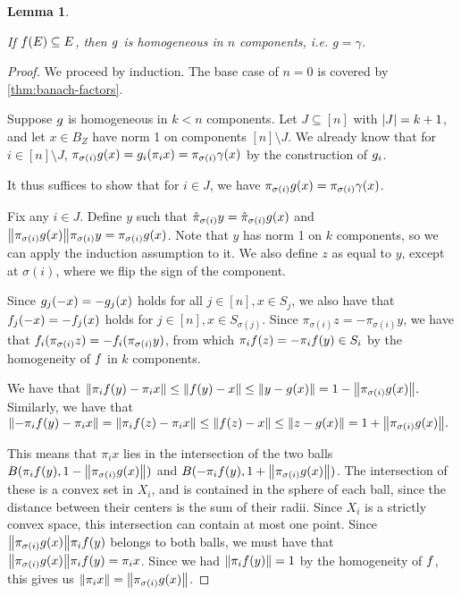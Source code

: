 \documentclass{amsart}
\newtheorem{lemma}{Lemma}[section]
\theoremstyle{definition}
\begin{document}
\begin{lemma} \label{lem:g-homogeneous}

  \annotation
  If $f(E) \subseteq E$, then $g$ is homogeneous in $n$ components, i.e. $g = \gamma$.
\end{lemma}
\begin{proof} 

  We proceed by induction. The base case of $n=0$ is covered by \autoref{thm:banach-factors}.

  Suppose $g$ is homogeneous in $k < n$ components. Let $J \subseteq [n]$ with
  $\abs{J} = k+1$, and let $x \in B_Z$ have norm 1 on components $[n] \setminus J$. We
  already know that for $i \in [n]\setminus J$, $\pi_{\sigma(i)} g(x) = g_i (\pi_i x)
  = \pi_{\sigma(i)} \gamma (x)$ by
  the construction of $g_i$.

  It thus suffices to show that for $i \in J$, we have $\pi_{\sigma(i)} g(x) =
  \pi_{\sigma(i)} \gamma(x)$.

	Fix any $i \in J$. Define $y$ such that $\hat{\pi}_{\sigma(i)} y = \hat{\pi}_{\sigma(i)} g(x)$ and $\norm{\pi_{\sigma(i)} g(x)} \pi_{\sigma(i)} y = \pi_{\sigma(i)} g(x)$. Note that
	$y$ has norm 1 on $k$ components, so we can apply the induction assumption to it.
	We also define $z$ as equal to $y$, except at $\sigma(i)$, where we flip the
	sign of the component.



	Since $g_j (-x) = -g_j (x)$ holds for all $j \in [n], x \in S_j$, we also have that
	$f_j (-x) = -f_j (x)$ holds for
	$j \in [n], x \in S_{\sigma(j)}$. Since $\pi_{\sigma(i)} z = -\pi_{\sigma(i)} y$, we have that
  $f_i (\pi_{\sigma(i)} z) = -f_i (\pi_{\sigma(i)} y)$, from which
  $\pi_i f(z) = -\pi_i f(y) \in S_i$ by the homogeneity of $f$ in $k$ components.

  We have that
  $ \norm{\pi_i f(y) - \pi_i x} \leq \norm{f(y) - x} \leq \norm{y - g(x)} = 1 - \norm{\pi_{\sigma(i)} g(x)}. $
	Similarly, we have that
  $ \norm{-\pi_i f(y) - \pi_i x} = \norm{\pi_i f(z) - \pi_i x} \leq \norm{f(z) - x} \leq \norm{z - g(x)} = 1 + \norm{\pi_{\sigma(i)} g(x)}. $


  This means that $\pi_i x$ lies in the
	intersection of the two balls $B(\pi_i f(y), 1-\norm{\pi_{\sigma(i)} g(x)})$ and
	$B(-\pi_i f(y), 1+\norm{\pi_{\sigma(i)} g(x)})$. The intersection of these is a convex
	set in $X_i$, and is contained in the sphere of each ball, since the distance between their centers is the sum of their radii. Since $X_i$ is a strictly
	convex space, this intersection can contain at most one point. Since
  $\norm{\pi_{\sigma(i)} g(x)}\pi_i f(y)$ belongs to both balls, we must have that
	$\norm{\pi_{\sigma(i)} g(x)}\pi_i f(y) = \pi_i x$. Since we had $\norm{\pi_i f(y)}=1$
	by the homogeneity of $f$, this gives us
  $\norm{\pi_i x} = \norm{\pi_{\sigma(i)} g(x)}$.


\end{proof}
\end{document}
